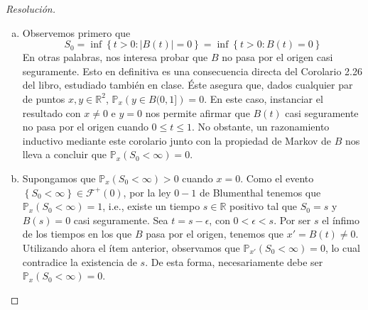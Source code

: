 \documentclass[a4paper,11pt]{article}
\newcommand{\abs}[1]{\ensuremath{\left\lvert #1 \right\rvert}}
\newcommand{\Probx}[2]{\ensuremath{\mathbb{P}_{#1} \left( #2 \right)}}
\newcommand{\Ev}[1]{\ensuremath{\left\{ #1 \right\}}}
\begin{document}
\begin{proof}[Resoluci\'on]
\begin{enumerate}[a.]
    \item Observemos primero que
    $$S_0 = \inf \left\{ t > 0 : \abs{B(t)} = 0 \right\}
          = \inf \left\{ t > 0 : B(t) = 0 \right\}$$
    En otras palabras, nos interesa probar que $B$ no pasa por el origen casi seguramente. Esto 
    en definitiva es una consecuencia directa del Corolario 2.26 del libro, estudiado también en 
    clase. Éste asegura que, dados cualquier par de puntos $x, y \in \mathbb{R}^2$,
    $\Probx{x}{y \in B(0,1]} = 0$. En este caso, instanciar el resultado con $x \neq 0$ e $y = 0$
    nos permite afirmar que $B(t)$ casi seguramente no pasa por el origen cuando
    $0 \leq t \leq 1$. No obstante, un razonamiento inductivo mediante este corolario junto con la
    propiedad de Markov de $B$ nos lleva a concluir que $\Probx{x}{S_0 < \infty} = 0$.

    \item Supongamos que $\Probx{x}{S_0 < \infty} > 0$ cuando $x = 0$. Como el evento
    $\Ev{S_0 < \infty} \in \mathcal{F}^{+}(0)$, por la ley $0-1$ de Blumenthal tenemos que
    $\Probx{x}{S_0 < \infty} = 1$, i.e., existe un tiempo $s \in \mathbb{R}$ positivo tal que
    $S_0 = s$ y $B(s) = 0$ casi seguramente. Sea $t = s - \epsilon$, con $0 < \epsilon < s$.
    Por ser $s$ el ínfimo de los tiempos en los que $B$ pasa por el origen, tenemos que
    $x'= B(t) \neq 0$. Utilizando ahora el ítem anterior, observamos que
    $\Probx{x'}{S_0 < \infty} = 0$, lo cual contradice la existencia de $s$. De esta forma,
    necesariamente debe ser $\Probx{x}{S_0 < \infty} = 0$.
\end{enumerate}
\end{proof}
\end{document}
